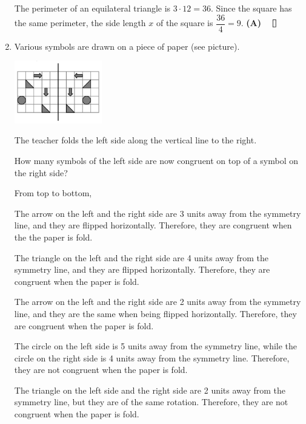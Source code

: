 \documentclass{report}
\begin{document}
\begin{multicols}{2}
\begin{enumerate}
              \sol{}

              The perimeter of an equilateral triangle is $3 \cdot 12 = 36$. Since the square
              has the same perimeter, the side length $x$ of the square is $\dfrac{36}{4} =
                  9$. \textbf{(A)} $\eos$

        \item Various symbols are drawn on a piece of paper (see picture).

              \begin{center}
                  \includegraphics[width=0.3\textwidth]{pictures/2.png}
              \end{center}

              The teacher folds the left side along the vertical line to the right.

              How many symbols of the left side are now congruent on top of a symbol on the
              right side?

              \sol{}

              From top to bottom,

              The arrow on the left and the right side are 3 units away from the symmetry
              line, and they are flipped horizontally. Therefore, they are congruent when the
              the paper is fold.

              The triangle on the left and the right side are 4 units away from the symmetry
              line, and they are flipped horizontally. Therefore, they are congruent when the
              paper is fold.

              The arrow on the left and the right side are 2 units away from the symmetry
              line, and they are the same when being flipped horizontally. Therefore, they
              are congruent when the paper is fold.

              The circle on the left side is 5 units away from the symmetry line, while the
              circle on the right side is 4 units away from the symmetry line. Therefore,
              they are not congruent when the paper is fold.

              The triangle on the left side and the right side are 2 units away from the
              symmetry line, but they are of the same rotation. Therefore, they are not
              congruent when the paper is fold.


\end{enumerate}
\end{multicols}
\end{document}
